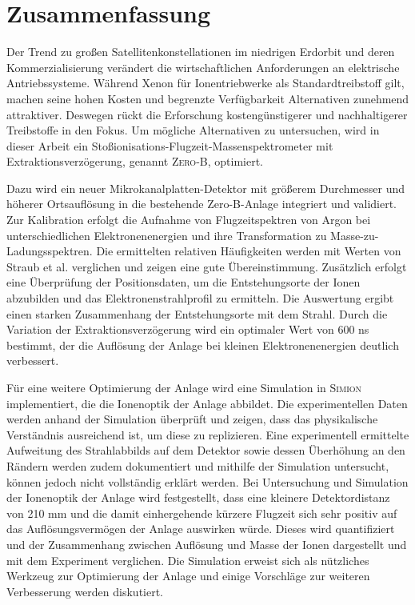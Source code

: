 \chapter*{Zusammenfassung}
Der Trend zu großen Satellitenkonstellationen im niedrigen Erdorbit und deren Kommerzialisierung verändert die wirtschaftlichen Anforderungen an elektrische Antriebssysteme. Während Xenon für Ionentriebwerke als Standardtreibstoff gilt, machen seine hohen Kosten und begrenzte Verfügbarkeit Alternativen zunehmend attraktiver. Deswegen rückt die Erforschung kostengünstigerer und nachhaltigerer Treibstoffe in den Fokus. Um mögliche Alternativen zu untersuchen, wird in dieser Arbeit ein Stoßionisations-Flugzeit-Massenspektrometer mit Extraktionsverzögerung, genannt \textsc{Zero-B}, optimiert. 

Dazu wird ein neuer Mikrokanalplatten-Detektor mit größerem Durchmesser und höherer Ortsauflösung in die bestehende Zero-B-Anlage integriert und validiert. Zur Kalibration erfolgt die Aufnahme von Flugzeitspektren von Argon bei unterschiedlichen Elektronenenergien und ihre Transformation zu Masse-zu-Ladungsspektren. Die ermittelten relativen Häufigkeiten werden mit Werten von Straub et al. \cite{Straub} verglichen und zeigen eine gute Übereinstimmung. Zusätzlich erfolgt eine Überprüfung der Positionsdaten, um die Entstehungsorte der Ionen abzubilden und das Elektronenstrahlprofil zu ermitteln. Die Auswertung ergibt einen starken Zusammenhang der Entstehungsorte mit dem Strahl. Durch die Variation der Extraktionsverzögerung wird ein optimaler Wert von 600 ns bestimmt, der die Auflösung der Anlage bei kleinen Elektronenenergien deutlich verbessert.

Für eine weitere Optimierung der Anlage wird eine Simulation in \textsc{Simion} implementiert, die die Ionenoptik der Anlage abbildet. Die experimentellen Daten werden anhand der Simulation überprüft und zeigen, dass das physikalische Verständnis ausreichend ist, um diese zu replizieren. Eine experimentell ermittelte Aufweitung des Strahlabbilds auf dem Detektor sowie dessen Überhöhung an den Rändern werden zudem dokumentiert und mithilfe der Simulation untersucht, können jedoch nicht vollständig erklärt werden. Bei Untersuchung und Simulation der Ionenoptik der Anlage wird festgestellt, dass eine kleinere Detektordistanz von 210 mm und die damit einhergehende kürzere Flugzeit sich sehr positiv auf das Auflösungsvermögen der Anlage auswirken würde. Dieses wird quantifiziert und der Zusammenhang zwischen Auflösung und Masse der Ionen dargestellt und mit dem Experiment verglichen. Die Simulation erweist sich als nützliches Werkzeug zur Optimierung der Anlage und einige Vorschläge zur weiteren Verbesserung werden diskutiert.

